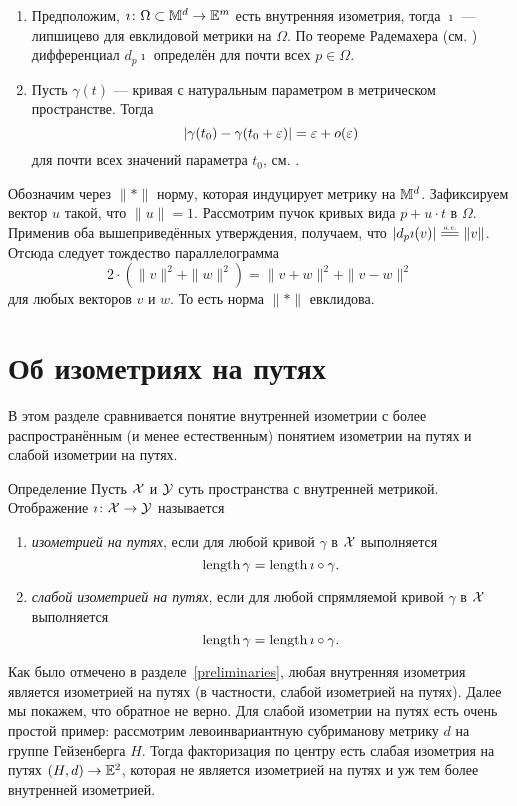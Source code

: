 \documentclass[oneside,a4paper]{article}
\begin{document}
\begin{enumerate}
\item Предположим, $\imath\colon\Omega\subset\mathbb{M}^d \to\mathbb{E}^m$ есть внутренняя изометрия, 
тогда $\imath$ --- липшицево для евклидовой метрики на $\Omega$.
По теореме Радемахера (см. \cite[3.1.6]{ref-to-df}) дифференциал $d_p\imath$ определён для почти всех $p\in \Omega$.
\item Пусть $\gamma(t)$ --- кривая с натуральным параметром в метрическом пространстве.
Тогда 
$$|\gamma({t_0})-\gamma({t_0+\varepsilon})|=\varepsilon+o(\varepsilon) $$
для почти всех значений параметра $t_0$,
см.  \cite[2.7.5]{BBI}.
\end{enumerate}
Обозначим через $\|{*}\|$ норму, которая индуцирует метрику на $\mathbb{M}^d$.
Зафиксируем вектор $u$ такой, что $\|u\|=1$.
Рассмотрим пучок кривых вида $p+u\cdot t$ в $\Omega$.
Применив оба вышеприведённых утверждения, получаем,
что $|d_p\imath(v)|\z\ae\|{v}\|$.
Отсюда следует тождество параллелограмма
$$2\cdot\left(\|v\|^2+\|w\|^2\right)=\|v+w\|^2+\|v-w\|^2$$
для любых векторов $v$ и $w$.
То есть норма $\|{*}\|$ евклидова.
\qeds









\section{Об изометриях на путях}\label{path.isometry}

В этом разделе сравнивается понятие внутренней изометрии с более распространённым (и менее естественным) понятием изометрии на путях и слабой изометрии на путях.

\begin{thm}{Определение}\label{def:path-iso}
Пусть $\mathcal{X}$ и $\mathcal{Y}$ суть пространства с внутренней метрикой.
Отображение $\imath\colon \mathcal{X}\to \mathcal{Y}$ называется 
\begin{enumerate}
\item\emph{изометрией на путях}, если для любой кривой $\gamma$ в $\mathcal{X}$ выполняется 
$$\mathop{\rm length}\nolimits \gamma=\mathop{\rm length}\nolimits \imath\circ\gamma.$$
\item\emph{слабой изометрией на путях}, если для любой спрямляемой кривой $\gamma$ в $\mathcal{X}$ выполняется
$$\mathop{\rm length}\nolimits \gamma=\mathop{\rm length}\nolimits \imath\circ\gamma.$$
\end{enumerate}
\end{thm}

Как было отмечено в разделе~\ref{preliminaries}, любая внутренняя изометрия является изометрией на путях 
(в частности, слабой изометрией на путях).
Далее мы покажем, что обратное не верно.
Для слабой изометрии на путях есть очень простой пример:
рассмотрим левоинвариантную субриманову метрику $d$ на группе Гейзенберга $H$.
Тогда факторизация по центру есть слабая изометрия на путях $(H,d)\to\mathbb{E}^2$, которая не является изометрией на путях и уж тем более  внутренней изометрией.
\end{document}

